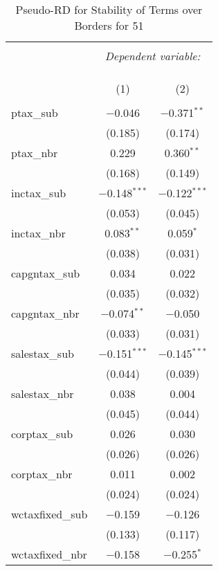 
\begin{table}[!htbp] \centering 
  \caption{Pseudo-RD for Stability of Terms over Borders for  51} 
  \label{} 
\begin{tabular}{@{\extracolsep{5pt}}lcc} 
\\[-1.8ex]\hline 
\hline \\[-1.8ex] 
 & \multicolumn{2}{c}{\textit{Dependent variable:}} \\ 
\cline{2-3} 
\\[-1.8ex] & \multicolumn{2}{c}{ } \\ 
\\[-1.8ex] & (1) & (2)\\ 
\hline \\[-1.8ex] 
 ptax\_sub & $-$0.046 & $-$0.371$^{**}$ \\ 
  & (0.185) & (0.174) \\ 
  ptax\_nbr & 0.229 & 0.360$^{**}$ \\ 
  & (0.168) & (0.149) \\ 
  inctax\_sub & $-$0.148$^{***}$ & $-$0.122$^{***}$ \\ 
  & (0.053) & (0.045) \\ 
  inctax\_nbr & 0.083$^{**}$ & 0.059$^{*}$ \\ 
  & (0.038) & (0.031) \\ 
  capgntax\_sub & 0.034 & 0.022 \\ 
  & (0.035) & (0.032) \\ 
  capgntax\_nbr & $-$0.074$^{**}$ & $-$0.050 \\ 
  & (0.033) & (0.031) \\ 
  salestax\_sub & $-$0.151$^{***}$ & $-$0.145$^{***}$ \\ 
  & (0.044) & (0.039) \\ 
  salestax\_nbr & 0.038 & 0.004 \\ 
  & (0.045) & (0.044) \\ 
  corptax\_sub & 0.026 & 0.030 \\ 
  & (0.026) & (0.026) \\ 
  corptax\_nbr & 0.011 & 0.002 \\ 
  & (0.024) & (0.024) \\ 
  wctaxfixed\_sub & $-$0.159 & $-$0.126 \\ 
  & (0.133) & (0.117) \\ 
  wctaxfixed\_nbr & $-$0.158 & $-$0.255$^{*}$ \\ 

\end{tabular}
\end{table}
